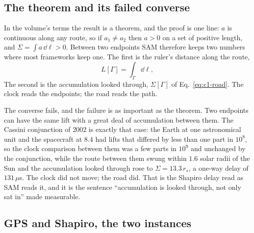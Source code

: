 \subsection{The theorem and its failed converse}

In the volume's terms the result is a theorem, and the proof is one line: $a$ is continuous along any route, so if $a_1\ne a_2$ then $a>0$ on a set of positive length, and $\Sigma=\int a\,\dd\ell>0$. Between two endpoints SAM therefore keeps two numbers where most frameworks keep one. The first is the ruler's distance along the route,
\begin{equation}
L[\Gamma]=\int_\Gamma \dd\ell,
\end{equation}
The second is the accumulation looked through, $\Sigma[\Gamma]$ of Eq.~\eqref{eq:c1-road}. The clock reads the endpoints; the road reads the path.

The converse fails, and the failure is as important as the theorem. Two endpoints can have the same lift with a great deal of accumulation between them. The Cassini conjunction of 2002 is exactly that case: the Earth at one astronomical unit and the spacecraft at 8.4 had lifts that differed by less than one part in $10^{8}$, so the clock comparison between them was a few parts in $10^9$ and unchanged by the conjunction, while the route between them swung within $1.6$ solar radii of the Sun and the accumulation looked through rose to $\Sigma=13.3\,r_s$, a one-way delay of $131\,\mu$s. The clock did not move; the road did. That is the Shapiro delay read as SAM reads it, and it is the sentence ``accumulation is looked through, not only sat in'' made measurable.

\subsection{GPS and Shapiro, the two instances}

